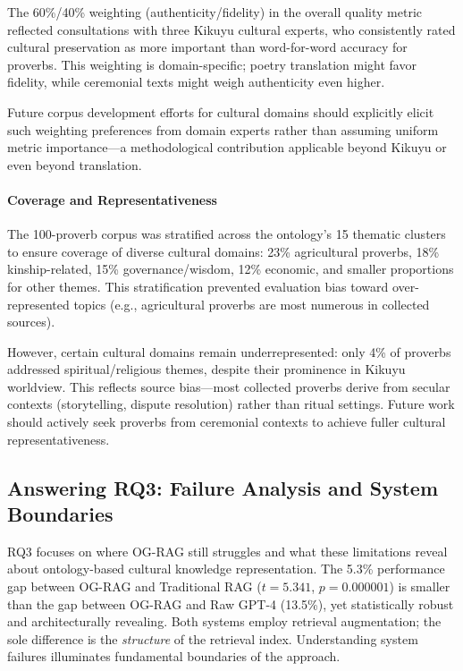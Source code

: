 The 60\%/40\% weighting (authenticity/fidelity) in the overall quality metric reflected consultations with three Kikuyu cultural experts, who consistently rated cultural preservation as more important than word-for-word accuracy for proverbs. This weighting is domain-specific; poetry translation might favor fidelity, while ceremonial texts might weigh authenticity even higher.

Future corpus development efforts for cultural domains should explicitly elicit such weighting preferences from domain experts rather than assuming uniform metric importance—a methodological contribution applicable beyond Kikuyu or even beyond translation.

\paragraph{Coverage and Representativeness}

The 100-proverb corpus was stratified across the ontology's 15 thematic clusters to ensure coverage of diverse cultural domains: 23\% agricultural proverbs, 18\% kinship-related, 15\% governance/wisdom, 12\% economic, and smaller proportions for other themes. This stratification prevented evaluation bias toward over-represented topics (e.g., agricultural proverbs are most numerous in collected sources).

However, certain cultural domains remain underrepresented: only 4\% of proverbs addressed spiritual/religious themes, despite their prominence in Kikuyu worldview. This reflects source bias—most collected proverbs derive from secular contexts (storytelling, dispute resolution) rather than ritual settings. Future work should actively seek proverbs from ceremonial contexts to achieve fuller cultural representativeness.

\subsection{Answering RQ3: Failure Analysis and System Boundaries}
\label{subsec:rq3_interpretation}

RQ3 focuses on where OG-RAG still struggles and what these limitations reveal about ontology-based cultural knowledge representation. The 5.3\% performance gap between OG-RAG and Traditional RAG ($t = 5.341$, $p = 0.000001$) is smaller than the gap between OG-RAG and Raw GPT-4 (13.5\%), yet statistically robust and architecturally revealing. Both systems employ retrieval augmentation; the sole difference is the \emph{structure} of the retrieval index. Understanding system failures illuminates fundamental boundaries of the approach.

